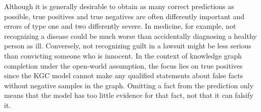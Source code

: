 Although it is generally desirable to obtain as many correct predictions as possible, true positives and true negatives are often differently important and errors of type one and two differently severe. In medicine, for example, not recognizing a disease could be much worse than accidentally diagnosing a healthy person as ill. Conversely, not recognizing guilt in a lawsuit might be less serious than convicting someone who is innocent. In the context of knowledge graph completion under the open-world assumption, the focus lies on true positives since the KGC model cannot make any qualified statements about false facts without negative samples in the graph. Omitting a fact from the prediction only means that the model has too little evidence for that fact, not that it can falsify it.
